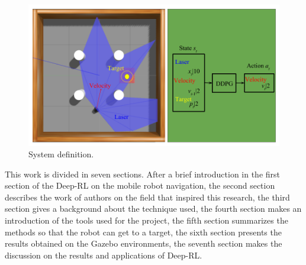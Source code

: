 \begin{figure}[htbp]
\centerline{\includegraphics[width=\columnwidth]{images/mapless_en.png}}
\caption{System definition.}
\label{fig:mapless}
\end{figure}

This work is divided in seven sections.
After a brief introduction in the first section of the Deep-RL on the mobile robot navigation, the second section describes the work of authors on the field that inspired this research, the third section gives a background about the technique used, the fourth section makes an introduction of the tools used for the project, the fifth section summarizes the methods so that the robot can get to a target, the sixth section presents the results obtained on the Gazebo environments, the seventh section makes the discussion on the results and applications of Deep-RL.




 



